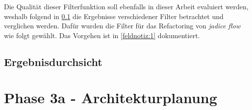 

Die Qualität dieser Filterfunktion soll ebenfalls in dieser Arbeit evaluiert werden, weshalb folgend in \cref{sec:phase2-ergebnisdurchsicht} die Ergebnisse verschiedener Filter betrachtet und verglichen werden.
Dafür wurden die Filter für das Refactoring von \emph{jadice flow} wie folgt gewählt.
Das Vorgehen ist in \cref{feldnotiz:1} dokumentiert.

\subsection{Ergebnisdurchsicht}
\label{sec:phase2-ergebnisdurchsicht}

\section{Phase 3a - Architekturplanung}
\label{sec:durchführung-phase3}